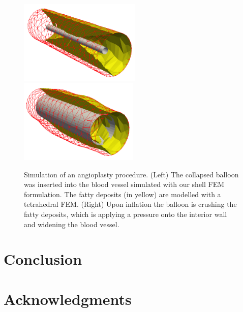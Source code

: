\documentclass{llncs}
\begin{document}
\begin{figure}
\centering
\includegraphics[height=4cm]{images/stent_begin.png}
\includegraphics[height=4cm]{images/stent_end.png}
\caption {Simulation of an angioplasty procedure. (Left) The collapsed balloon was inserted into the blood vessel simulated with our shell FEM formulation. The fatty deposits (in yellow) are modelled with a tetrahedral FEM. (Right) Upon inflation the balloon is crushing the fatty deposits, which is applying a pressure onto the interior wall and widening the blood vessel.}
\label{fig-stent}
\end{figure}


\section{Conclusion}
\section*{Acknowledgments}



\end{document}
